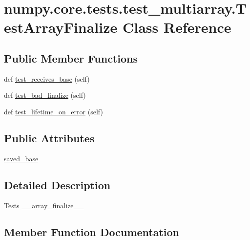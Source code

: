 \hypertarget{classnumpy_1_1core_1_1tests_1_1test__multiarray_1_1TestArrayFinalize}{}\section{numpy.\+core.\+tests.\+test\+\_\+multiarray.\+Test\+Array\+Finalize Class Reference}
\label{classnumpy_1_1core_1_1tests_1_1test__multiarray_1_1TestArrayFinalize}
\subsection*{Public Member Functions}
\begin{DoxyCompactItemize}
\item 
def \hyperlink{classnumpy_1_1core_1_1tests_1_1test__multiarray_1_1TestArrayFinalize_ac55205cdcbebaf3fee2403042167c1d9}{test\+\_\+receives\+\_\+base} (self)
\item 
def \hyperlink{classnumpy_1_1core_1_1tests_1_1test__multiarray_1_1TestArrayFinalize_a034b612067f8531068ecbb6ff8864a47}{test\+\_\+bad\+\_\+finalize} (self)
\item 
def \hyperlink{classnumpy_1_1core_1_1tests_1_1test__multiarray_1_1TestArrayFinalize_a847d321c8f5cbb21ecea492a98aeb4df}{test\+\_\+lifetime\+\_\+on\+\_\+error} (self)
\end{DoxyCompactItemize}
\subsection*{Public Attributes}
\begin{DoxyCompactItemize}
\item 
\hyperlink{classnumpy_1_1core_1_1tests_1_1test__multiarray_1_1TestArrayFinalize_ad332660c94e0dc445428b13c6a5ca273}{saved\+\_\+base}
\end{DoxyCompactItemize}


\subsection{Detailed Description}
\begin{DoxyVerb}Tests __array_finalize__ \end{DoxyVerb}
 

\subsection{Member Function Documentation}
\mbox{\label{classnumpy_1_1core_1_1tests_1_1test__multiarray_1_1TestArrayFinalize_a034b612067f8531068ecbb6ff8864a47}} 
